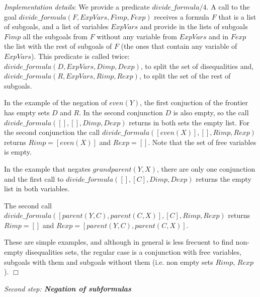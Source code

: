 \documentclass{tlp}
\begin{document}
\noindent
\emph{Implementation details}: We provide a predicate $divide\_formula/4$. A
call to the goal $divide\_formula(F,ExpVars,Fimp,Fexp)$ receives a formula $F$
that is a list of subgoals, and a list of variables $ExpVars$ and provide in
the lists of subgoals $Fimp$ all the subgoals from $F$ without any variable
from $ExpVars$ and in $Fexp$ the list with the rest of subgoals of $F$ (the
ones that contain any variable of $ExpVars$). This predicate is called twice:
 $divide\_formula(D,ExpVars,Dimp,Dexp)$, to split the set of disequalities
and, $divide\_formula(R,ExpVars,Rimp,Rexp)$, to split the set of the
rest of subgoals.

In the example of the negation of $even(Y)$, the first conjuction of the
frontier has empty sets $D$ and $R$. In the second conjunction $D$ is also 
empty, so the call $divide\_formula([],[],Dimp,Dexp)$ returns in both sets the
empty list. For the second conjunction the call
$divide\_formula([even(X)],[],Rimp,Rexp)$ returns $Rimp=[even(X)]$ and
$Rexp=[]$. Note that the set of free variables is empty.

In the example that negates $grandparent(Y,X)$, there are only one conjunction
and the first call to $divide\_formula([],[C],Dimp,Dexp)$ returns the empty
list in both variables. 

The second call $divide\_formula([parent(Y,C),parent(C,X)],[C],Rimp,Rexp)$
returns $Rimp=[]$ and $Rexp=[parent(Y,C),parent(C,X)]$.

These are simple examples, and although in general is less frecuent to find
non-empty disequalities sets, the regular case is a conjunction with free
variables, subgoals with them and subgoals without them (i.e. non empty sets
$Rimp$, $Rexp$). $\Box$
\medskip

\noindent
{\em Second step: {\bf Negation of subformulas}}
\end{document}
